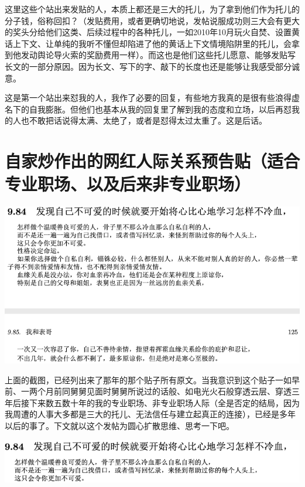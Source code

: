 \documentclass[9pt, b5paper]{article}
\begin{document}
这里这些个站出来发贴的人，本质上都还是三大的托儿，为了拿到他们作为托儿的分子钱，俗称回扣？（发贴费用，或者更确切地说，发帖说服成功则三大会有更大的奖头分给他们这类、后续过程中的各种托儿，一如2010年10月玩火自焚、设置黄话上下文、让单纯的我听不懂但却陷进了他的黄话上下文情境陷阱里的托儿，会拿到他发动舆论导火索的奖励费用一样）。而这也是他们这些托儿愿意、能够发贴写长文的一部分原因。因为长文、写下的字、敲下的长度也还是能够让我感受部分诚意。

这是第一个站出来怼我的人，我作了必要的回复，有些地方我真的是很有些浪得虚名下的自我膨胀。但他们也基本从我的回复里了解到我的态度和立场，以后再怼我的人也不敢把话说得太满、太绝了，或者是怼得太过太重了。这是后话。 

\section{自家炒作出的网红人际关系预告贴（适合专业职场、以及后来非专业职场）}
\label{sec:org1d32114}

\begin{center}
\includegraphics[width=.9\linewidth]{./pic/p1p125.png}
\end{center}

上面的截图，已经列出来了那年的那个贴子所有原文。当我意识到这个贴子一如早前、一两个月前同舅舅见面时舅舅所说过的话般、如电光火石般穿透云层、穿透三年后接下来数五数十年的我的专业职场、非专业职场人际（全是否定的结局，因为我周遭的人事大多都是三大的托儿、无法信任与建立起真正的连接），已经是多年以后的事了。下文就以这个发帖为圆心扩散思维、思考一下吧。 

\begin{center}
\includegraphics[width=.9\linewidth]{./pic/backups_plans_20210413_130937.png}
\end{center}
\end{document}
